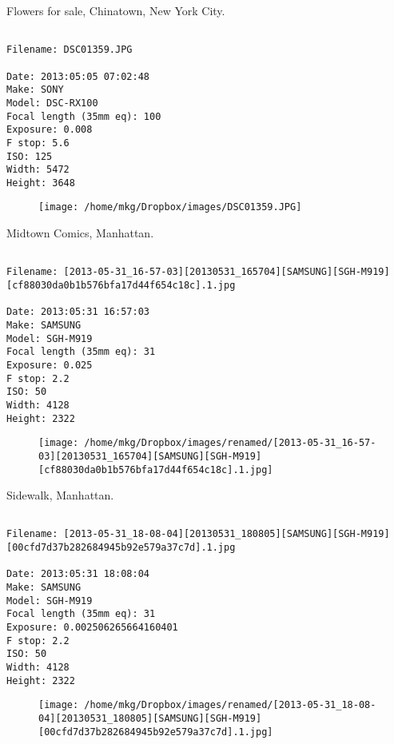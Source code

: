\clearpage
\onecolumn
\noindent Flowers for sale, Chinatown, New York City.
\noindent
\begin{lstlisting}

Filename: DSC01359.JPG

Date: 2013:05:05 07:02:48
Make: SONY
Model: DSC-RX100
Focal length (35mm eq): 100
Exposure: 0.008
F stop: 5.6
ISO: 125
Width: 5472
Height: 3648
\end{lstlisting}
\clearpage

\begin{figure}
\texttt{[image: /home/mkg/Dropbox/images/DSC01359.JPG]}
\end{figure}
    
\clearpage
\onecolumn
\noindent Midtown Comics, Manhattan.
\noindent
\begin{lstlisting}

Filename: [2013-05-31_16-57-03][20130531_165704][SAMSUNG][SGH-M919][cf88030da0b1b576bfa17d44f654c18c].1.jpg

Date: 2013:05:31 16:57:03
Make: SAMSUNG
Model: SGH-M919
Focal length (35mm eq): 31
Exposure: 0.025
F stop: 2.2
ISO: 50
Width: 4128
Height: 2322
\end{lstlisting}
\clearpage

\begin{figure}
\texttt{[image: /home/mkg/Dropbox/images/renamed/[2013-05-31\_16-57-03][20130531\_165704][SAMSUNG][SGH-M919][cf88030da0b1b576bfa17d44f654c18c].1.jpg]}
\end{figure}
    
\clearpage
\onecolumn
\noindent Sidewalk, Manhattan.
\noindent
\begin{lstlisting}

Filename: [2013-05-31_18-08-04][20130531_180805][SAMSUNG][SGH-M919][00cfd7d37b282684945b92e579a37c7d].1.jpg

Date: 2013:05:31 18:08:04
Make: SAMSUNG
Model: SGH-M919
Focal length (35mm eq): 31
Exposure: 0.002506265664160401
F stop: 2.2
ISO: 50
Width: 4128
Height: 2322
\end{lstlisting}
\clearpage

\begin{figure}
\texttt{[image: /home/mkg/Dropbox/images/renamed/[2013-05-31\_18-08-04][20130531\_180805][SAMSUNG][SGH-M919][00cfd7d37b282684945b92e579a37c7d].1.jpg]}
\end{figure}
    
